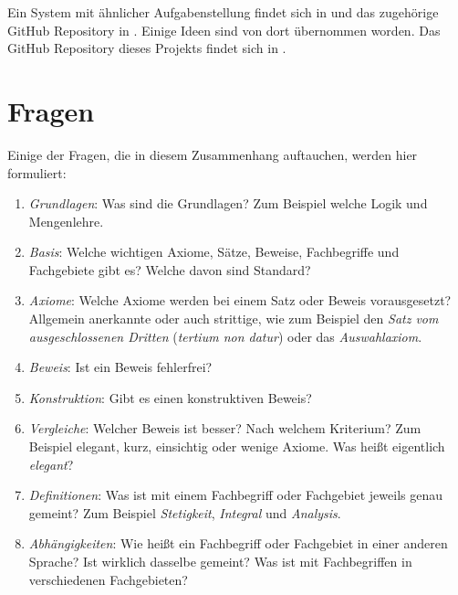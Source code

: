 \documentclass[english,ngerman,parskip=half,headsepline,footsepline]{scrreprt}
\begin{document}
	Ein System mit ähnlicher Aufgabenstellung findet sich in \cite{HilbertII} und das zugehörige GitHub Repository in \cite{qedeq}. Einige Ideen sind von dort übernommen worden. Das GitHub Repository dieses Projekts findet sich in \cite{ASBA}.
	
	\section{Fragen}
	\label{sec:Fragen}
	Einige der Fragen, die in diesem Zusammenhang auftauchen, werden hier formuliert:
	
	\begin{enumerate}
		
		\item \label{Frage:Grundlagen} \emph{Grundlagen}: Was sind die Grundlagen? Zum Beispiel welche Logik und Mengenlehre.
		
		\item \label{Frage:Basis} \emph{Basis}: Welche wichtigen Axiome, Sätze, Beweise, Fachbegriffe und Fachgebiete gibt es? Welche davon sind Standard?
		
		\item \label{Frage:Axiome} \emph{Axiome}: Welche Axiome werden bei einem Satz oder Beweis vorausgesetzt? Allgemein anerkannte oder auch strittige, wie zum Beispiel den \emph{Satz vom ausgeschlossenen Dritten} (\emph{tertium non datur}) oder das \emph{Auswahlaxiom}.
		
		\item \label{Frage:Beweis} \emph{Beweis}: Ist ein Beweis fehlerfrei?
		
		\item \label{Frage:Konstruktion} \emph{Konstruktion}: Gibt es einen konstruktiven Beweis?
		
		\item \label{Frage:Vergleiche} \emph{Vergleiche}: Welcher Beweis ist besser? Nach welchem Kriterium? Zum Beispiel elegant, kurz, einsichtig oder wenige Axiome. Was heißt eigentlich \emph{elegant}?
		
		\item \label{Frage:Definitionen} \emph{Definitionen}: Was ist mit einem Fachbegriff oder Fachgebiet jeweils genau gemeint? Zum Beispiel \emph{Stetigkeit}, \emph{Integral} und \emph{Analysis}.
		
		\item \label{Frage:Abhängigkeiten} \emph{Abhängigkeiten}: Wie heißt ein Fachbegriff oder Fachgebiet in einer anderen Sprache? Ist wirklich dasselbe gemeint? Was ist mit Fachbegriffen in verschiedenen Fachgebieten?
		

\end{enumerate}
\end{document}

